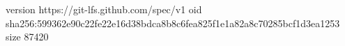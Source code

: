 version https://git-lfs.github.com/spec/v1
oid sha256:599362e90c22fe22e16d38bdca8b8c6fea825f1e1a82a8c70285bcf1d3ea1253
size 87420
